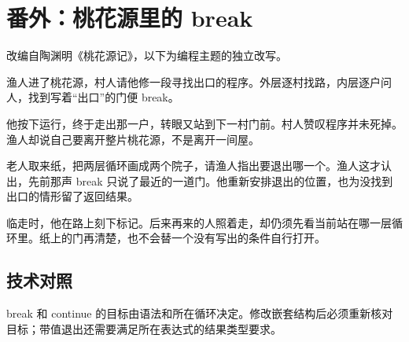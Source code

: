\section{番外：桃花源里的 break}

改编自陶渊明《桃花源记》，以下为编程主题的独立改写。

渔人进了桃花源，村人请他修一段寻找出口的程序。外层逐村找路，内层逐户问人，找到写着“出口”的门便 break。

他按下运行，终于走出那一户，转眼又站到下一村门前。村人赞叹程序并未死掉。渔人却说自己要离开整片桃花源，不是离开一间屋。

老人取来纸，把两层循环画成两个院子，请渔人指出要退出哪一个。渔人这才认出，先前那声 break 只说了最近的一道门。他重新安排退出的位置，也为没找到出口的情形留了返回结果。

临走时，他在路上刻下标记。后来再来的人照着走，却仍须先看当前站在哪一层循环里。纸上的门再清楚，也不会替一个没有写出的条件自行打开。

\subsection*{技术对照}

break 和 continue 的目标由语法和所在循环决定。修改嵌套结构后必须重新核对目标；带值退出还需要满足所在表达式的结果类型要求。
